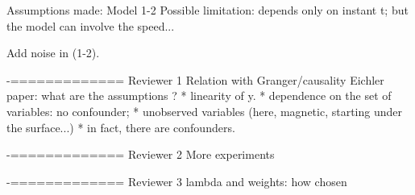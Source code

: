 Assumptions made:
Model 1-2
Possible limitation: depends only on instant t; 
but the model can involve the speed...

Add noise in (1-2).

-============= Reviewer 1
Relation with Granger/causality
Eichler paper: what are the assumptions ? 
* linearity of y.
* dependence on the set of variables: no confounder;
* unobserved variables (here, magnetic, starting under the surface...)
* in fact, there are confounders. 


-============= Reviewer 2
More experiments

-============= Reviewer 3
lambda and weights: how chosen